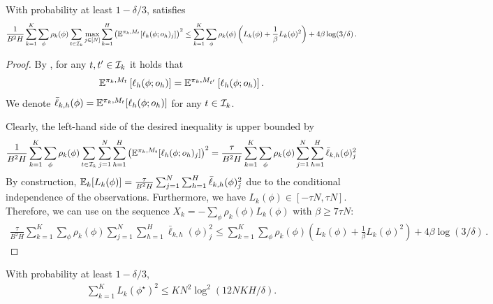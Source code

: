 \begin{lemma}\label{lem: est part1}
With probability at least $1-\delta/3$,  
 satisfies
\begin{align*}
    \frac{1}{B^2H}\sum_{k=1}^K \sum_\phi \rho_k(\phi) \sum_{t\in\mathcal{I}_k} \max_{j\in[N]} \sum_{h=1}^H \left(\mathbb{E}^{\pi_k, M_t}[\ell_h(\phi; o_{h})_j]  \right)^2 \leq \sum_{k=1}^K\sum_{\phi}\rho_{k}(\phi)\left(L_k(\phi) + \frac{1}{\beta}L_k(\phi)^2\right)+4\beta\log(3/\delta)\,.
\end{align*}
\end{lemma}
\begin{proof}
By , for any $t,t'\in\mathcal{I}_k$ it holds that
\begin{align*}
    \mathbb{E}^{\pi_k, M_t}\left[ \ell_h(\phi; o_{h}) \right] = \mathbb{E}^{\pi_k, M_{t'}}\left[ \ell_h(\phi; o_{h}) \right]. 
\end{align*}
We denote $\bar\ell_{k,h}(\phi) = \mathbb{E}^{\pi_k, M_t}[\ell_h(\phi; o_{h})]$ for any $t\in\mathcal{I}_k$. 

Clearly, the left-hand side of the desired inequality is upper bounded by  
\begin{align*}
    \frac{1}{B^2H}\sum_{k=1}^K \sum_\phi \rho_k(\phi) \sum_{t\in\mathcal{I}_k} \sum_{j=1}^N \sum_{h=1}^H \left(\mathbb{E}^{\pi_k, M_t}[\ell_h(\phi; o_{h})_j]  \right)^2 = \frac{\tau}{B^2H} \sum_{k=1}^K\sum_{\phi}\rho_{k}(\phi)\sum_{j=1}^N \sum_{h=1}^H\bar\ell_{k,h}(\phi)^2_j 
\end{align*}
By construction, $\mathbb{E}_{k}[L_k(\phi)]=\frac{\tau}{B^2H}\sum_{j=1 }^N\sum_{h=1}^H\bar\ell_{k,h}(\phi)^2_j$ due to the conditional independence of the observations. Furthermore, we have $L_k(\phi)\in[-\tau N,\tau N]$. Therefore, we can use  on the sequence $X_k=-\sum_{\phi}\rho_k(\phi)L_k(\phi)$ with $\beta \geq 7\tau N$: 
    \begin{align*}
        \frac{\tau}{B^2H}\sum_{k=1}^K\sum_{\phi}\rho_{k}(\phi)\sum_{j=1}^N\sum_{h=1}^H\bar\ell_{k,h}(\phi)^2_j\leq\sum_{k=1}^K\sum_{\phi}\rho_{k}(\phi)\left(L_k(\phi) + \frac{1}{\beta}L_k(\phi)^2\right)+4\beta\log(3/\delta)\,.
    \end{align*}
\end{proof}
\begin{lemma}\label{lem: est part2}
    With probability at least $1-\delta/3$,
    \begin{align*}
        \sum_{k=1}^KL_k(\phi^\star)^2 \leq KN^2\log^2(12NKH/\delta). 
    \end{align*}
\end{lemma}
